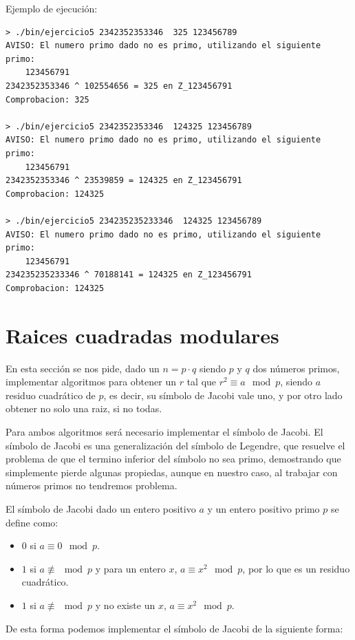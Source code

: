 \documentclass[12pt, spanish]{article}
\begin{document}
Ejemplo de ejecución:

\begin{lstlisting}
> ./bin/ejercicio5 2342352353346  325 123456789
AVISO: El numero primo dado no es primo, utilizando el siguiente primo:
	123456791
2342352353346 ^ 102554656 = 325 en Z_123456791
Comprobacion: 325

> ./bin/ejercicio5 2342352353346  124325 123456789
AVISO: El numero primo dado no es primo, utilizando el siguiente primo:
	123456791
2342352353346 ^ 23539859 = 124325 en Z_123456791
Comprobacion: 124325

> ./bin/ejercicio5 234235235233346  124325 123456789
AVISO: El numero primo dado no es primo, utilizando el siguiente primo:
	123456791
234235235233346 ^ 70188141 = 124325 en Z_123456791
Comprobacion: 124325
\end{lstlisting}


\section{Raices cuadradas modulares}

En esta sección se nos pide, dado un $n = p \cdot q$ siendo $p$ y $q$ dos números primos, implementar algoritmos para obtener un $r$ tal que $r^2 \equiv a \mod p$, siendo $a$ residuo cuadrático de $p$, es decir, su símbolo de Jacobi vale uno, y por otro lado obtener no solo una raiz, si no todas.

Para ambos algoritmos será necesario implementar el símbolo de Jacobi. El símbolo de Jacobi es una generalización del símbolo de Legendre, que resuelve el problema de que el termino inferior del símbolo no sea primo, demostrando que simplemente pierde algunas propiedas, aunque en nuestro caso, al trabajar con números primos no tendremos problema.

El símbolo de Jacobi dado un entero positivo $a$ y un entero positivo primo $p$ se define como:

\begin{itemize}
	\item $0$ si $a \equiv 0 \mod p$.
	\item $1$ si $a \not \equiv \mod p$ y para un entero $x$, $a \equiv x^2 \mod p$, por lo que es un residuo cuadrático.
	\item $1$ si $a \not \equiv \mod p$ y no existe un $x$, $a \equiv x^2 \mod p$.
\end{itemize}

De esta forma podemos implementar el símbolo de Jacobi de la siguiente forma:
\end{document}
